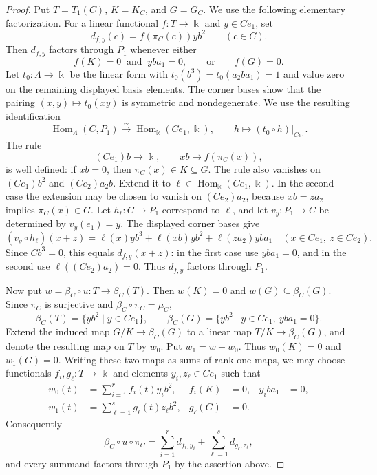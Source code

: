 \documentclass[a4paper,11pt,reqno]{amsart}
\theoremstyle{definition}
\theoremstyle{plain}
\numberwithin{equation}{section}
\newcommand{\Hom}{\operatorname{Hom}}
\newcommand{\kk}{\Bbbk}
\begin{document}
\begin{proof}
Put \(T=T_1(C)\), \(K=K_C\), and \(G=G_C\).  We use the following
elementary factorization.  For a linear functional \(f:T\to\kk\) and
\(y\in Ce_1\), set
\[
 d_{f,y}(c)=f(\pi_C(c))yb^2\qquad(c\in C).
\]
Then \(d_{f,y}\) factors through \(P_1\) whenever either
\[
 f(K)=0\ \text{ and }\ yba_1=0,
 \qquad\text{or}\qquad
 f(G)=0.
\]
Let \(t_0:\Lambda\to\kk\) be the linear form with
\(t_0(b^3)=t_0(a_2ba_1)=1\) and value zero on the remaining displayed
basis elements.  The corner bases show that the pairing
\((x,y)\mapsto t_0(xy)\) is symmetric and nondegenerate.  We use the
resulting identification
\[
 \Hom_\Lambda(C,P_1)\xrightarrow{\sim}\Hom_\kk(Ce_1,\kk),
 \qquad h\longmapsto(t_0\circ h)|_{Ce_1}.
\]
The rule
\[
 (Ce_1)b\longrightarrow\kk,\qquad xb\longmapsto f(\pi_C(x)),
\]
is well defined: if \(xb=0\), then \(\pi_C(x)\in K\subseteq G\).  The rule
also vanishes on \((Ce_1)b^2\) and \((Ce_2)a_2b\).  Extend it to
\(\ell\in\Hom_\kk(Ce_1,\kk)\).  In the second case the extension may be
chosen to vanish on \((Ce_2)a_2\), because
\(xb=za_2\) implies \(\pi_C(x)\in G\).  Let
\(h_\ell:C\to P_1\) correspond to \(\ell\),
and let \(v_y:P_1\to C\) be determined by \(v_y(e_1)=y\).  The displayed
corner bases give
\[
 (v_y\circ h_\ell)(x+z)
 =\ell(x)yb^3+\ell(xb)yb^2+\ell(za_2)yba_1
 \quad(x\in Ce_1,\ z\in Ce_2).
\]
Since \(Cb^3=0\), this equals \(d_{f,y}(x+z)\): in the first case use
\(yba_1=0\), and in the second use
\(\ell((Ce_2)a_2)=0\).  Thus \(d_{f,y}\) factors through \(P_1\).

Now put \(w=\beta_C\circ u:T\to\beta_C(T)\).  Then
\(w(K)=0\) and \(w(G)\subseteq\beta_C(G)\).  Since \(\pi_C\) is
surjective and \(\beta_C\circ\pi_C=\mu_C\),
\[
 \beta_C(T)=\{yb^2\mid y\in Ce_1\},
 \qquad
 \beta_C(G)=\{yb^2\mid y\in Ce_1,\ yba_1=0\}.
\]
Extend the induced map \(G/K\to\beta_C(G)\) to a linear map
\(T/K\to\beta_C(G)\), and denote the resulting map on \(T\) by
\(w_0\).  Put \(w_1=w-w_0\).  Thus \(w_0(K)=0\) and \(w_1(G)=0\).
Writing these two maps as sums of rank-one maps, we may choose
functionals \(f_i,g_\ell:T\to\kk\) and elements
\(y_i,z_\ell\in Ce_1\) such that
\[
\begin{aligned}
 w_0(t)&=\sum_{i=1}^r f_i(t)y_i b^2,
 & f_i(K)&=0,
 & y_i ba_1&=0,\\
 w_1(t)&=\sum_{\ell=1}^s g_\ell(t)z_\ell b^2,
 & g_\ell(G)&=0.
\end{aligned}
\]
Consequently
\[
 \beta_C\circ u\circ\pi_C
 =\sum_{i=1}^r d_{f_i,y_i}
  +\sum_{\ell=1}^s d_{g_\ell,z_\ell},
\]
and every summand factors through \(P_1\) by the assertion above.
\end{proof}
\end{document}
